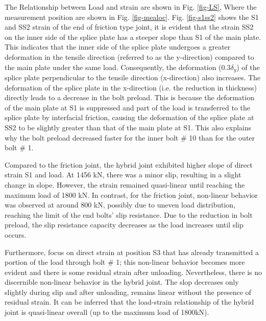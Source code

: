 The Relationship between Load and strain are shown in Fig. \ref{fig-LS}, Where the measurement position are shown in Fig. \ref{fig-mealoc}. Fig. \ref{fig-s1ss2} shows the S1 and SS2 strain of the end of friction type joint, it is evident that the strain SS2 on the inner side of the splice plate has a steeper slope than S1 of the main plate. This indicates that the inner side of the splice plate undergoes a greater deformation in the tensile direction (referred to as the y-direction) compared to the main plate under the same load. Consequently, the deformation ($0.3\delta_y$) of the splice plate perpendicular to the tensile direction (x-direction) also increases. The deformation of the splice plate in the x-direction (i.e. the reduction in thickness) directly leads to a decrease in the bolt preload. This is because the deformation of the main plate at S1 is suppressed and part of the load is transferred to the splice plate by interfacial friction, causing the deformation of the splice plate at SS2 to be slightly greater than that of the main plate at S1. This also explains why the bolt preload decreased faster for the inner bolt \# 10 than for the outer bolt \# 1.

Compared to the friction joint, the hybrid joint exhibited higher slope of direct strain S1 and load. At 1456 kN, there was a minor slip, resulting in a slight change in slope. However, the strain remained quasi-linear until reaching the maximum load of 1800 kN. In contrast, for the friction joint, non-linear behavior was observed at around 800 kN, possibly due to uneven load distribution, reaching the limit of the end bolts' slip resistance. Due to the reduction in bolt preload, the slip resistance capacity decreases as the load increases until slip occurs.

Furthermore, focus on direct strain at position S3 that has already transmitted a portion of the load through bolt \# 1; this non-linear behavior becomes more evident and there is some residual strain after unloading. Nevertheless, there is no discernible non-linear behavior in the hybrid joint. The slop decreases only slightly during slip and after unloading, remains linear without the presence of residual strain. It can be inferred that the load-strain relationship of the hybrid joint is quasi-linear overall (up to the maximum load of 1800kN).


